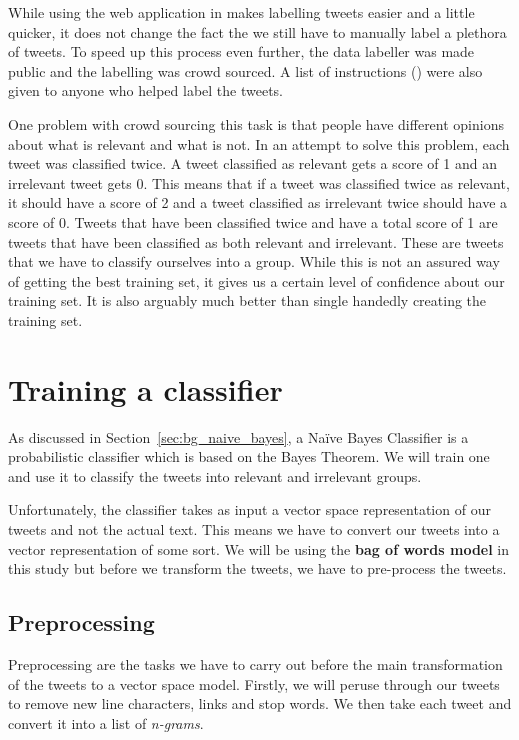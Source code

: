 While using the web application in  makes labelling tweets easier and a
little quicker, it does not change the fact the we still have to manually label a plethora of
tweets. To speed up this process even further, the data labeller was made public and the labelling
was crowd sourced. A list of instructions () were also given
to anyone who helped label the tweets.

One problem with crowd sourcing this task is that people have different opinions about what is
relevant and what is not. In an attempt to solve this problem, each tweet was classified twice. A
tweet classified as relevant gets a score of 1 and an irrelevant tweet gets 0. This means that if a
tweet was classified twice as relevant, it should have a score of 2 and a tweet classified as
irrelevant twice should have a score of 0. Tweets that have been classified twice and have a total
score of 1 are tweets that have been classified as both relevant and irrelevant. These are tweets
that we have to classify ourselves into a group. While this is not an assured way of getting the
best training set, it gives us a certain level of confidence about our training set. It is also
arguably much better than single handedly creating the training set.

\section{Training a classifier}
As discussed in Section~\ref{sec:bg_naive_bayes}, a Na\"{i}ve Bayes Classifier is a probabilistic
classifier which is based on the Bayes Theorem. We will train one and use it to classify the tweets
into relevant and irrelevant groups.

Unfortunately, the classifier takes as input a vector space representation of our tweets and not the
actual text. This means we have to convert our tweets into a vector representation of some sort. We
will be using the \textbf{bag of words model} in this study but before we transform the tweets, we
have to pre-process the tweets.

\subsection{Preprocessing}
\label{sec:preprocessing}
Preprocessing are the tasks we have to carry out before the main transformation of the tweets to a
vector space model. Firstly, we will peruse through our tweets to remove new line characters, links
and stop words. We then take each tweet and convert it into a list of \textit{n-grams}.

